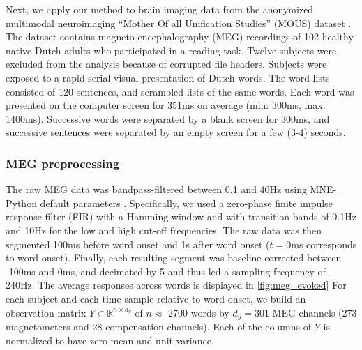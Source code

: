 
Next, we apply our method to brain imaging data from the anonymized multimodal
neuroimaging ``Mother Of all Unification Studies'' (MOUS) dataset
\citep{schoffelen2019204}. The dataset contains magneto-encephalography (MEG)
recordings of 102 healthy native-Dutch adults who participated in a reading
task. Twelve subjects were excluded from the analysis because of corrupted file headers.
%
Subjects were exposed to a rapid serial visual presentation of Dutch words. The
word lists consisted of 120 sentences, and scrambled lists of the same words.
Each word was presented on the computer screen for 351ms on average (min: 300ms,
max: 1400ms). Successive words were separated by a blank screen for 300ms, and
successive sentences were separated by an empty screen for a few (3-4) seconds.

\subsubsection{MEG preprocessing}

The raw MEG data was bandpass-filtered between 0.1 and 40Hz using MNE-Python
default parameters \citep{gramfort2013meg, gramfort2014mne}. Specifically, we used a zero-phase finite impulse
response filter (FIR) with a Hamming window and with transition bands of 0.1Hz
and 10Hz for the low and high cut-off frequencies. The raw data was then segmented 100ms before word onset and 1s after
word onset ($t=0$ms corresponds to word onset). Finally, each resulting
segment was baseline-corrected between -100ms and 0ms, and decimated by 5 and
thus led a sampling frequency of 240Hz. The average responses across words is displayed in \ref{fig:meg_evoked}
For each subject and each time sample relative to word onset, we
build an observation matrix $Y \in \mathbb{R}^{n \times d_y}$ of $n\approx$ 2700 words
by $d_y=301$ MEG channels (273 magnetometers and 28 compensation channels). Each
of the columns of $Y$ is normalized to have zero mean and unit variance.

